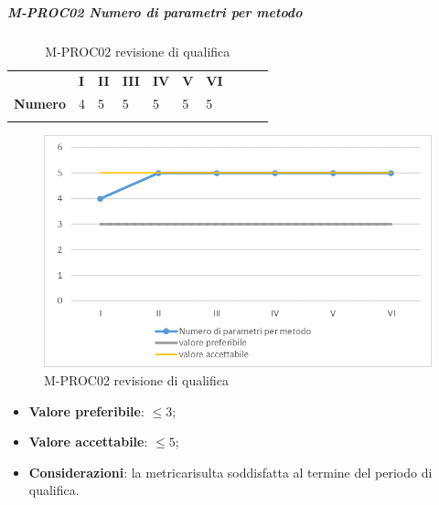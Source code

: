 \subparagraph{M-PROC02 Numero di parametri per metodo} \mbox{}
\begin{longtable}[H!] {						
		>{}p{50mm}  		
		>{}p{8mm}
		>{}p{8mm}		
		>{}p{8mm}		
		>{}p{8mm}		
		>{}p{8mm}		
		>{}p{8mm}
		>{}p{8mm}
		>{}p{8mm}
		>{}p{8mm}
	}
	\rowcolor{gray!50}
	\textbf{} & \textbf{I} & \textbf{II} & \textbf{III} & \textbf{IV} & \textbf{V} & \textbf{VI} \TBstrut \\ [2mm]
	\textbf{Numero} & 4 & 5 & 5 & 5 & 5 & 5 \TBstrut \\ [2mm]
	\rowcolor{white}
	\caption{M-PROC02 revisione di qualifica}
\end{longtable}
\begin{figure}[H] 	
	\includegraphics[width=\linewidth]{./img/grafici/RQ2.png}	
	\caption{M-PROC02 revisione di qualifica}	
\end{figure}
\begin{itemize}
	\item \textbf{Valore preferibile}: $\le 3$;
	\item \textbf{Valore accettabile}: $\le 5$;
	\item \textbf{Considerazioni}: la metrica\glosp risulta soddisfatta al termine del periodo di qualifica.
\end{itemize}

